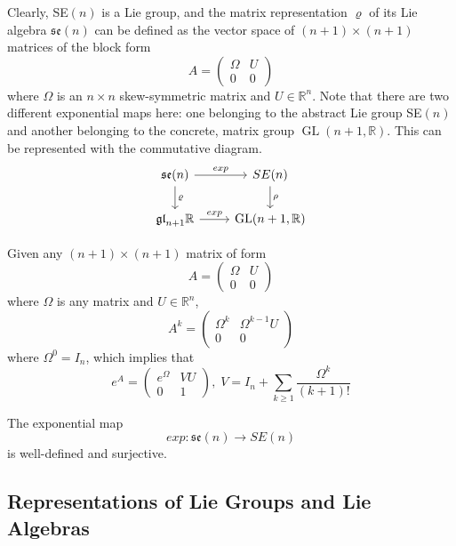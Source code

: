 \documentclass{article}
\DeclareMathOperator{\GL}{GL}
\begin{document}
      Clearly, SE$(n)$ is a Lie group, and the matrix representation $\varrho$ of its Lie algebra $\mathfrak{se}(n)$ can be defined as the vector space of $(n+1) \times (n+1)$ matrices of the block form 
      \[A = \begin{pmatrix}
      \Omega & U \\0 & 0
      \end{pmatrix}\]
      where $\Omega$ is an $n \times n$ skew-symmetric matrix and $U \in \mathbb{R}^n$. Note that there are two different exponential maps here: one belonging to the abstract Lie group SE$(n)$ and another belonging to the concrete, matrix group $\GL(n+1, \mathbb{R})$. This can be represented with the commutative diagram. 
      \[\begin{tikzcd}
      \mathfrak{se}(n) \arrow{r}{exp} \arrow{d}{\varrho} & SE(n) \arrow{d} {\rho}\\
      \mathfrak{gl}_{n+1} \mathbb{R} \arrow{r}{exp} & \GL(n+1, \mathbb{R})
      \end{tikzcd}\]
      \begin{lemma}
      Given any $(n+1) \times (n+1)$ matrix of form 
      \[A = \begin{pmatrix}
       \Omega & U \\0&0
      \end{pmatrix}\]
      where $\Omega$ is any matrix and $U \in \mathbb{R}^n$, 
      \[A^k = \begin{pmatrix}
      \Omega^k & \Omega^{k-1} U \\0&0
      \end{pmatrix}\]
      where $\Omega^0 = I_n$, which implies that
      \[e^A = \begin{pmatrix}
      e^\Omega & V U \\ 0 & 1
      \end{pmatrix}, \; V = I_n + \sum_{k \geq 1} \frac{\Omega^k}{(k+1)!}\]
      \end{lemma}

      \begin{theorem}
      The exponential map
      \[exp: \mathfrak{se}(n) \longrightarrow SE(n)\]
      is well-defined and surjective. 
      \end{theorem}

  \subsection{Representations of Lie Groups and Lie Algebras}
\end{document}
